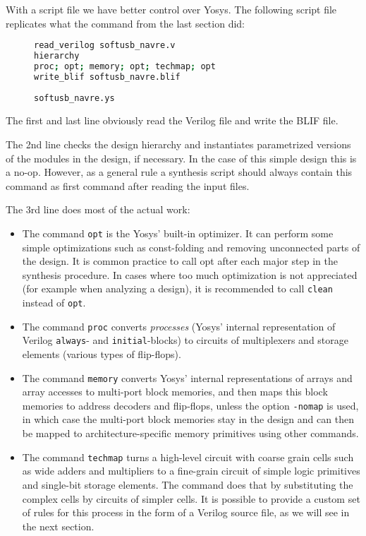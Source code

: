 \documentclass[9pt,technote,a4paper]{IEEEtran}
\begin{document}
With a script file we have better control over Yosys. The following script
file replicates what the command from the last section did:

\begin{figure}[H]
\begin{lstlisting}[language=sh]
read_verilog softusb_navre.v
hierarchy
proc; opt; memory; opt; techmap; opt
write_blif softusb_navre.blif
\end{lstlisting}
 \renewcommand{\figurename}{Listing}
\caption{\tt softusb\_navre.ys}
\end{figure}

The first and last line obviously read the Verilog file and write the BLIF
file.

\medskip

The 2nd line checks the design hierarchy and instantiates parametrized
versions of the modules in the design, if necessary. In the case of this
simple design this is a no-op. However, as a general rule a synthesis script
should always contain this command as first command after reading the input
files.

\medskip

The 3rd line does most of the actual work:

\begin{itemize}
\item The command {\tt opt} is the Yosys' built-in optimizer. It can perform
some simple optimizations such as const-folding and removing unconnected parts
of the design. It is common practice to call opt after each major step in the
synthesis procedure. In cases where too much optimization is not appreciated
(for example when analyzing a design), it is recommended to call {\tt clean}
instead of {\tt opt}.
\item The command {\tt proc} converts {\it processes} (Yosys' internal
representation of Verilog {\tt always}- and {\tt initial}-blocks) to circuits
of multiplexers and storage elements (various types of flip-flops).
\item The command {\tt memory} converts Yosys' internal representations of
arrays and array accesses to multi-port block memories, and then maps this
block memories to address decoders and flip-flops, unless the option {\tt -nomap}
is used, in which case the multi-port block memories stay in the design
and can then be mapped to architecture-specific memory primitives using
other commands.
\item The command {\tt techmap} turns a high-level circuit with coarse grain
cells such as wide adders and multipliers to a fine-grain circuit of simple
logic primitives and single-bit storage elements. The command does that by
substituting the complex cells by circuits of simpler cells. It is possible
to provide a custom set of rules for this process in the form of a Verilog
source file, as we will see in the next section.
\end{itemize}
\end{document}
